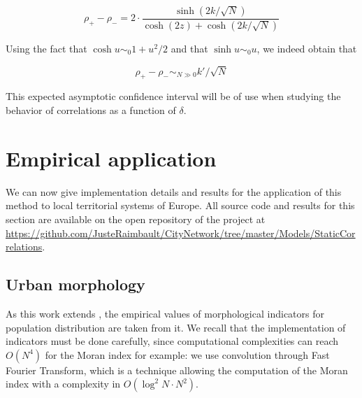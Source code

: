 
\begin{equation}
	\rho_{+} - \rho_{-} = 2\cdot \frac{\sinh{(2k/\sqrt{N})}}{\cosh{(2z)} + \cosh{(2k/\sqrt{N})}}
\end{equation}


Using the fact that $\cosh u \sim_0 1 + u^2/2$ and that $\sinh u \sim_0 u$, we indeed obtain that 

\begin{equation}
\rho_{+} - \rho_{-} \sim_{N\gg 0} k' / \sqrt{N}
\label{eq:confidenceinterval}
\end{equation}

This expected asymptotic confidence interval will be of use when studying the behavior of correlations as a function of $\delta$.




\section{Empirical application}

We can now give implementation details and results for the application of this method to local territorial systems of Europe. All source code and results for this section are available on the open repository of the project at \url{https://github.com/JusteRaimbault/CityNetwork/tree/master/Models/StaticCorrelations}.

\subsection{Urban morphology}

As this work extends \cite{2017arXiv170806743R}, the empirical values of morphological indicators for population distribution are taken from it. We recall that the implementation of indicators must be done carefully, since computational complexities can reach $O(N^4)$ for the Moran index for example: we use convolution through Fast Fourier Transform, which is a technique allowing the computation of the Moran index with a complexity in $O(\log^2 N \cdot N^2)$.

